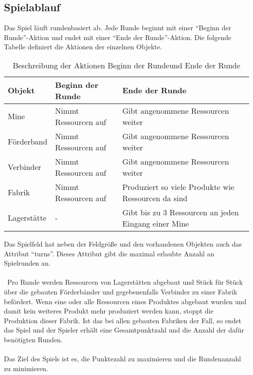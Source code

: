 \subsection{Spielablauf}
Das Spiel läuft rundenbasiert ab. Jede Runde beginnt mit einer “Beginn der Runde”-Aktion und endet mit einer “Ende der Runde”-Aktion.
Die folgende Tabelle definiert die Aktionen der einzelnen Objekte. 
\begin{table}
\begin{center}
\begin{tabular}{ | l | l | l | } 
	\hline
	\textbf{Objekt}& \textbf{Beginn der Runde} & \textbf{Ende der Runde} \\ \hline
	Mine & Nimmt Ressourcen auf & Gibt angenommene Ressourcen weiter \\ \hline
	Förderband & Nimmt Ressourcen auf & Gibt angenommene Ressourcen weiter \\ \hline
	Verbinder & Nimmt Ressourcen auf & Gibt angenommene Ressourcen weiter \\ \hline
	Fabrik & Nimmt Ressourcen auf & Produziert so viele Produkte wie Ressourcen da sind \\ \hline
	Lagerstätte & - & Gibt bis zu 3 Ressourcen an jeden Eingang einer Mine \\ \hline
\end{tabular}
\caption{Beschreibung der Aktionen \dq Beginn der Runde\dq  und \dq Ende der Runde\dq }
\end{center}
\end{table}
Das Spielfeld hat neben der Feldgröße und den vorhandenen Objekten auch das Attribut “turns”. Dieses Attribut gibt die maximal erlaubte Anzahl an Spielrunden an.
\\\\\
Pro Runde werden Ressourcen von Lagerstätten abgebaut und Stück für Stück über die gebauten Förderbänder und gegebenenfalls Verbinder zu einer Fabrik befördert. Wenn eine oder alle Ressourcen eines Produktes abgebaut wurden und damit kein weiteres Produkt mehr produziert werden kann, stoppt die Produktion dieser Fabrik. Ist das bei allen gebauten Fabriken der Fall, so endet das Spiel und der Spieler erhält eine Gesamtpunktzahl und die Anzahl der dafür benötigten Runden.
\\\\
Das Ziel des Spiels ist es, die Punktezahl zu maximieren und die Rundenanzahl zu minimieren.


